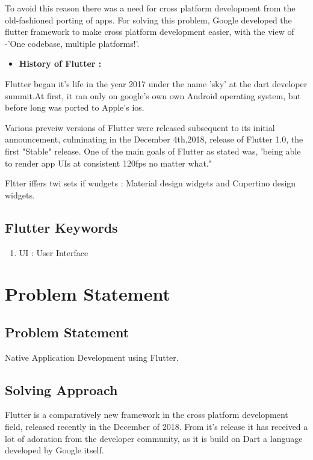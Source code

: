 \documentclass[11pt,a4paper,oneside,openright]{report}
\begin{document}
{{\hspace{0.2in} To avoid this reason there was a need for cross platform development from the old-fashioned porting of apps. For solving this problem, Google developed the flutter framework to make cross platform development easier, with the view of -'One codebase, multiple platforms!'.
			

\begin{itemize}

\item {\bf History of Flutter : }
\end{itemize}
\hspace{0.2in} Flutter began it's life in the year 2017 under the name 'sky' at the dart developer summit.At first, it ran only on google's own own Android operating system, but before long was ported to Apple's ios. 

\hspace{0.2in} Various preveiw versions of Flutter were released subsequent to its initial announcement, culminating in the December  4th,2018, release of Flutter 1.0, the first "Stable" release. One of the main goals of Flutter as stated was, 'being able to render app UIs at consistent 120fps no matter what."

\hspace{0.2in} Fltter iffers twi sets if wudgets : Material design widgets and Cupertino design widgets.

\section{Flutter Keywords}
 \begin{enumerate}
 \item UI : User Interface
 \end{enumerate}


\chapter{Problem Statement}\label{chap:project outline}

\section{Problem Statement}
 Native Application Development using Flutter.
\section{Solving Approach}
	Flutter is a comparatively new framework in the cross platform development field, released recently in the December of 2018. From it's release it has received a lot of adoration from the developer community, as it is build on Dart a language developed by Google itself.  

}}
\end{document}
